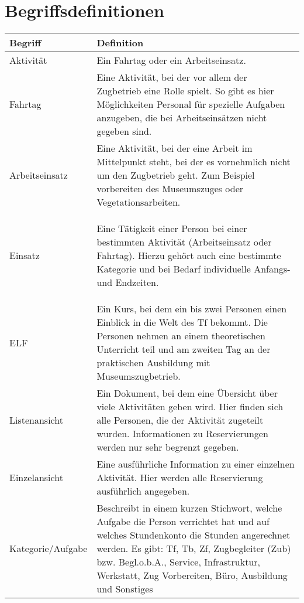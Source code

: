 \section{Begriffsdefinitionen}\label{glossar}
\begin{tabularx}{\textwidth}{l|X}
  Begriff	& Definition \\
  \hline
  \hline
  Aktivität &
    Ein Fahrtag oder ein Arbeitseinsatz. \\
  \hline
  Fahrtag	&
    Eine Aktivität, bei der vor allem der Zugbetrieb eine Rolle spielt.
    So gibt es hier Möglichkeiten Personal für spezielle Aufgaben anzugeben, die bei Arbeitseinsätzen nicht gegeben sind.\\
  \hline
  Arbeitseinsatz &
    Eine Aktivität, bei der eine Arbeit im Mittelpunkt steht, bei der es vornehmlich nicht um den Zugbetrieb geht.
    Zum Beispiel vorbereiten des Museumszuges oder Vegetationsarbeiten. \\
  \hline
  Einsatz &
  \begin{neu}
    Eine Tätigkeit einer Person bei einer bestimmten Aktivität (Arbeitseinsatz oder Fahrtag).
    Hierzu gehört auch eine bestimmte Kategorie und bei Bedarf individuelle Anfangs- und Endzeiten.
\end{neu}
     \\
  \hline
  ELF &
    Ein Kurs, bei dem ein bis zwei Personen einen Einblick in die Welt des Tf bekommt.
    Die Personen nehmen an einem theoretischen Unterricht teil und am zweiten Tag an der praktischen Ausbildung mit Museumszugbetrieb.\\
  \hline
  Listenansicht &
    Ein Dokument, bei dem eine Übersicht über viele Aktivitäten geben wird.
    Hier finden sich alle Personen, die der Aktivität zugeteilt wurden.
    Informationen zu Reservierungen werden nur sehr begrenzt gegeben. \\
  \hline
  Einzelansicht &
  	Eine ausführliche Information zu einer einzelnen Aktivität.
    Hier werden alle Reservierung ausführlich angegeben. \\
  \hline
  Kategorie/Aufgabe &
  	Beschreibt in einem kurzen Stichwort, welche Aufgabe die Person verrichtet hat und auf welches Stundenkonto die Stunden angerechnet werden. \newline
    Es gibt: Tf, Tb, Zf, Zugbegleiter (Zub) bzw. Begl.o.b.A., Service, Infrastruktur, Werkstatt, Zug Vorbereiten, Büro, Ausbildung und Sonstiges
\end{tabularx}
